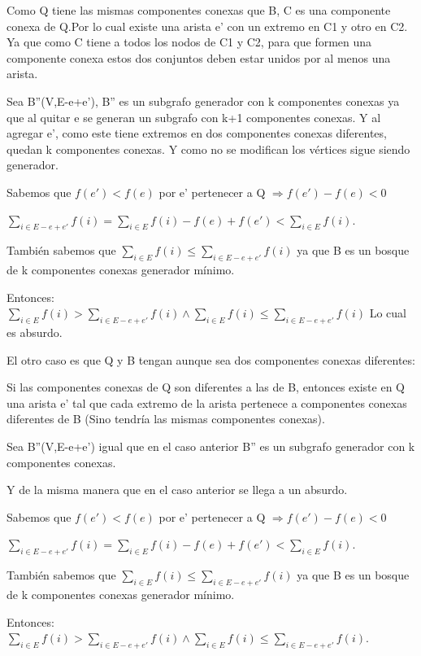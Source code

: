 Como Q tiene las mismas componentes conexas que B, C es una componente conexa de Q.Por lo cual existe una arista e' con un extremo en C1 y otro en C2. Ya que como C tiene a todos los nodos de C1 y C2, para que formen una componente conexa estos dos conjuntos deben estar unidos por al menos una arista.

Sea B''(V,E-e+e'), B'' es un subgrafo generador con k componentes conexas ya que al quitar e se generan un subgrafo con k+1 componentes conexas. Y al agregar e', como este  tiene extremos en dos componentes conexas diferentes, quedan k componentes conexas. Y como no se modifican los vértices sigue siendo generador.

Sabemos que $f(e') < f(e)$ por e' pertenecer a Q $\Rightarrow f(e') - f(e) < 0$

$\sum_{i \in E-e+e'} f(i) = \sum_{i \in E} f(i) - f(e) + f(e') < \sum_{i \in E} f(i)$.

También sabemos que $\sum_{i \in E} f(i) \leq \sum_{i \in E-e+e'} f(i)$ ya que B es un bosque de k componentes conexas generador mínimo.

Entonces: $\sum_{i \in E} f(i) > \sum_{i \in E-e+e'} f(i) \wedge \sum_{i \in E} f(i) \leq \sum_{i \in E-e+e'} f(i)$
Lo cual es absurdo.

El otro caso es que Q y B tengan aunque sea dos componentes conexas diferentes:

Si las componentes conexas de Q son diferentes a las de B, entonces existe en Q una arista e' tal que cada extremo de la arista pertenece a componentes conexas diferentes de B (Sino tendría las mismas componentes conexas).

Sea B''(V,E-e+e') igual que en el caso anterior B'' es un subgrafo generador con k componentes conexas.

Y de la misma manera que en el caso anterior se llega a un absurdo.

Sabemos que $f(e') < f(e)$ por e' pertenecer a Q $\Rightarrow f(e') - f(e) < 0$

$\sum_{i \in E-e+e'} f(i) = \sum_{i \in E} f(i) - f(e) + f(e') < \sum_{i \in E} f(i)$.

También sabemos que $\sum_{i \in E} f(i) \leq \sum_{i \in E-e+e'} f(i)$ ya que B es un bosque de k componentes conexas generador mínimo.

Entonces: $\sum_{i \in E} f(i) > \sum_{i \in E-e+e'} f(i) \wedge \sum_{i \in E} f(i) \leq \sum_{i \in E-e+e'} f(i)$. \\ \\


